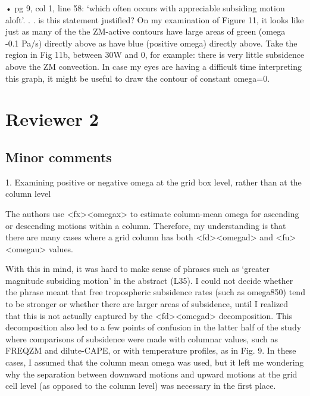 \documentclass[12pt,oneside,a4paper]{article}%
\begin{document}
{\color{red}{Thank you for pointing out these grammatical errors, they have been fixed. Irregardless flew right off my tongue and onto paper ... h/t for catching that. }} \newline

• pg 9, col 1, line 58: ‘which often occurs with appreciable subsiding motion
aloft’. . . is this statement justified? On my examination of Figure 11, it
looks like just as many of the the ZM-active contours have large areas of
green (omega ~ -0.1 Pa/s) directly above as have blue (positive omega)
directly above. Take the region in Fig 11b, between 30W and 0, for example:
there is very little subsidence above the ZM convection. In case my eyes
are having a difficult time interpreting this graph, it might be useful to
draw the contour of constant omega=0. \newline


\section*{\large Reviewer 2}

\subsection*{\small Minor comments}

1. Examining positive or negative omega at the grid box level, rather than at the column level \newline

The authors use <fx><omegax> to estimate column-mean omega for ascending or descending motions within a column. Therefore, my understanding is that there are many cases where a grid column has both <fd><omegad> and <fu><omegau> values. \newline

With this in mind, it was hard to make sense of phrases such as ‘greater magnitude subsiding motion’ in the abstract (L35). I could not decide whether the phrase meant that free tropospheric subsidence rates (such as omega850) tend to be stronger or whether there are larger areas of subsidence, until I realized that this is not actually captured by the <fd><omegad> decomposition. This decomposition also led to a few points of confusion in the latter half of the study where comparisons of subsidence were made with columnar values, such as FREQZM and dilute-CAPE, or with temperature profiles, as in Fig. 9. In these cases, I assumed that the column mean omega was used, but it left me wondering why the separation between downward motions and upward motions at the grid cell level (as opposed to the column level) was necessary in the first place. \newline
\end{document}
